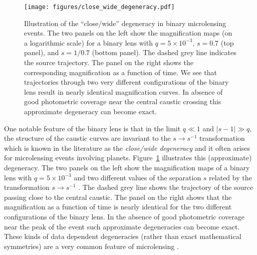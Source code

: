 \documentclass[12pt]{report}
\begin{document}
\begin{figure}[t]
    \centering
    \texttt{[image: figures/close\_wide\_degeneracy.pdf]}
    \caption{Illustration of the ``close/wide'' degeneracy in binary microlensing events.
        The two panels on the left show the magnification maps (on a logarithmic scale) for
        a binary lens with $q=5\times 10^{-3}$, $s=0.7$ (top panel), and $s=1/0.7$
        (bottom panel). The dashed grey line indicates the source trajectory. The panel
        on the right shows the corresponding magnification as a function of time.
        We see that trajectories through two very different configurations of the binary lens
        result in nearly identical magnification curves. In absence of good
        photometric coverage near the central caustic crossing this approximate degeneracy
        can become exact.}
    \label{fig:close_wide_degeneracy}
\end{figure}

One notable feature of the binary lens is that in the limit $q\ll 1$ and
$\lvert s-1\rvert \gg q$, the structure of the caustic curves are invariant to
the $s\rightarrow s^{-1}$ transformation \citet{dominik1999} which is known in
the literature as the \emph{close/wide degeneracy} and it often arises for
microlensing events involving planets. Figure~\ref{fig:close_wide_degeneracy}
illustrates this (approximate) degeneracy. The two panels on the left show the
magnification maps of a binary lens with $q=5\times 10^{-3}$ and two different
values of the separation $s$ related by the transformation $s\rightarrow
    s^{-1}$ . The dashed grey line shows the trajectory of the source passing close
to the central caustic. The panel on the right shows that the magnification as
a function of time is nearly identical for the two different configurations of
the binary lens. In the absence of good photometric coverage near the peak of
the event such approximate degeneracies can become exact. These kinds of data
dependent degeneracies (rather than exact mathematical symmetries) are a very
common feature of microlensing \citep{erdl1993}.
\end{document}
